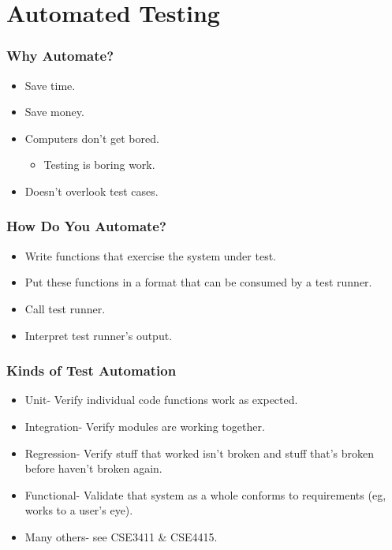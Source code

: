 \section{Automated Testing}

\begin{frame}
  \frametitle{Why Automate?}
  \begin{itemize}
    \item Save time.
    \item Save money.
    \item Computers don't get bored.
    \begin{itemize}
      \item Testing is boring work.
    \end{itemize}
    \item Doesn't overlook test cases.
  \end{itemize}
\end{frame}

\begin{frame}
  \frametitle{How Do You Automate?}
  \begin{itemize}
    \item Write functions that exercise the system under test.
    \item Put these functions in a format that can be consumed by a test runner.
    \item Call test runner.
    \item Interpret test runner's output.
  \end{itemize}
\end{frame}

\begin{frame}
  \frametitle{Kinds of Test Automation}
  \begin{itemize}
    \item Unit- Verify individual code functions work as expected.
    \item Integration- Verify modules are working together.
    \item Regression- Verify stuff that worked isn't broken and stuff that's broken before haven't broken again.
    \item Functional- Validate that system as a whole conforms to requirements (eg, works to a user's eye).
    \item Many others- see CSE3411 \& CSE4415.
  \end{itemize}
\end{frame}

